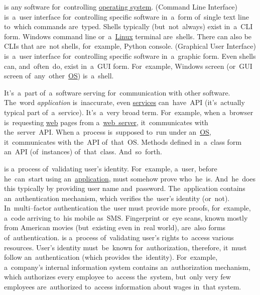 \label{shellcligui}
\begin{itemize}
     is any software for~controlling \hyperref[os]{operating system}.
     (Command Line Interface) is~a~user interface for~controlling specific software in~a~form of~single text line to~which commands are~typed.
            Shells typically (but~not~always) exist in~a~CLI form.
            Windows command line or~a~\hyperref[linux]{Linux} terminal are~shells.
            There can also be CLIs that are~not shells, for~example, Python console.
     (Graphical User Interface) is~a~user interface for~controlling specific software in~a~graphic form.
            Even shells can, and~often~do, exist in~a~GUI form.
            For~example, Windows screen (or~GUI screen of~any~other~\hyperref[os]{OS}) is~a~shell.
\end{itemize}

\label{api}
It's~a~part of~a~software serving for~communication with other software.
The~word \textit{application} is~inaccurate, even \hyperref[applicationprocessprogramservicethread]{services} can~have~API (it's~actually typical part of~a~service).
It's~a~very broad term.
For~example, when a~browser is~requesting \hyperref[internetweb]{web} pages from a~\hyperref[webserver]{web~server}, it~communicates with the~server~API\@.
When a~process is~supposed to~run under an~\hyperref[os]{OS}, it~communicates with the~API of~that~OS\@.
Methods defined in~a~class form an~API (of~instances) of~that~class.
And~so~forth.

\label{authenticationauthorization}
\begin{itemize}
     is a~process of~validating user's identity.
            For~example, a~user, before he~can~start using an~\hyperref[applicationprocessprogramservicethread]{application}, must somehow prove who~he~is.
            And~he~does this typically by providing user name and~password.
            The~application contains an~authentication mechanism, which verifies the~user's identity (or~not).
            In~multi--factor authentication the~user must provide more proofs, for~example, a~code arriving to~his mobile as~SMS.
            Fingerprint or~eye scans, known mostly from American movies (but~existing even in~real world), are~also forms of~authentication.
     is a~process of~validating user's rights to~access various resources.
            User's identity must~be~known for~authorization, therefore, it~must follow an~authentication (which provides the~identity).
            For~example, a~company's internal information system contains an~authorization mechanism, which authorizes every employee to~access the~system, but~only very few employees are~authorized to~access information about wages in~that system.
\end{itemize}
